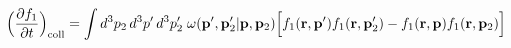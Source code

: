 \documentclass[preview]{standalone}
\begin{document}
\begin{align*}
\special{dvisvgm:raw <g id='unique000'>}\Big(\pdv{f_1}{t}\Big)_{\rm coll}=\int d^3p_2\,d^3p'\,d^3p_2'\;\omega(\va p',\va p_2'|\va p,\va p_2)\Big[f_1(\va r,\va p')f_1(\va r,\va p_2')-f_1(\va r,\va p)f_1(\va r,\va p_2)\Big]\special{dvisvgm:raw </g>}
\end{align*}
\end{document}
